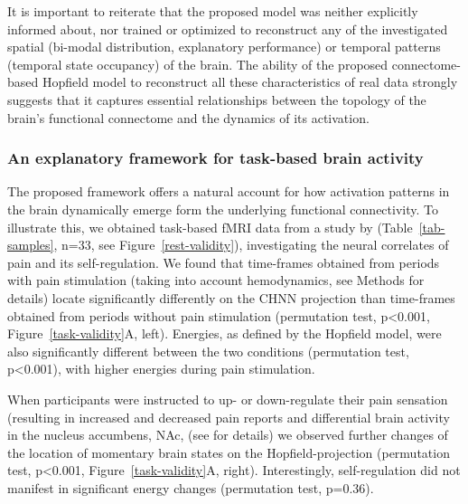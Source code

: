 \documentclass{article}
\begin{document}
It is important to reiterate that the proposed model was neither explicitly informed about, nor trained or optimized to reconstruct any of the investigated spatial (bi-modal distribution, explanatory performance) or temporal patterns (temporal state occupancy) of the brain.
The ability of the proposed connectome-based Hopfield model to reconstruct all these characteristics of real data strongly suggests that it captures essential relationships between the topology of the brain's functional connectome and the dynamics of its activation.

\subsubsection{An explanatory framework for task-based brain activity}\label{An explanatory framework for task-based brain activity}

The proposed framework offers a natural account for how activation patterns in the brain dynamically emerge form the
underlying functional connectivity. To illustrate this, we obtained task-based fMRI data from a study by
\citet{woo2015distinct} (Table~\ref{tab-samples}, n=33, see Figure~\ref{rest-validity}), investigating the neural
correlates of pain and its self-regulation. We found that time-frames obtained from periods with pain stimulation
(taking into account hemodynamics, see Methods for details) locate significantly differently on the CHNN projection
than time-frames obtained from periods without pain stimulation (permutation test, p\textless 0.001, Figure~\ref{task-validity}A,
left). Energies, as defined by the Hopfield model, were also significantly different between the two conditions
(permutation test, p\textless 0.001), with higher energies during pain stimulation.

When participants were instructed to up- or down-regulate their pain sensation (resulting in increased and decreased
pain reports and differential brain activity in the nucleus accumbens, NAc, (see \citep{woo2015distinct} for details)
we observed further changes of the location of momentary brain states on the Hopfield-projection (permutation test,
p\textless 0.001, Figure~\ref{task-validity}A, right). Interestingly, self-regulation did not manifest in significant energy changes
(permutation test, p=0.36).
\end{document}
